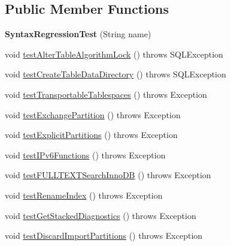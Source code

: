 \subsection*{Public Member Functions}
\begin{DoxyCompactItemize}
\item 
\mbox{\label{classtestsuite_1_1regression_1_1_syntax_regression_test_a55470891999b68b586366e1eef322aab}} 
{\bfseries Syntax\+Regression\+Test} (String name)
\item 
void \mbox{\hyperlink{classtestsuite_1_1regression_1_1_syntax_regression_test_ad8db7c4293c435d564218db929d2d30d}{test\+Alter\+Table\+Algorithm\+Lock}} ()  throws S\+Q\+L\+Exception 
\item 
void \mbox{\hyperlink{classtestsuite_1_1regression_1_1_syntax_regression_test_a5e613256d2f2d7d6fbd6144c8b050670}{test\+Create\+Table\+Data\+Directory}} ()  throws S\+Q\+L\+Exception 
\item 
void \mbox{\hyperlink{classtestsuite_1_1regression_1_1_syntax_regression_test_a947576b5790653a73ac1cf0185c76fdd}{test\+Transportable\+Tablespaces}} ()  throws Exception 
\item 
void \mbox{\hyperlink{classtestsuite_1_1regression_1_1_syntax_regression_test_a27af4a565f65e6f33db3e05e87a2035a}{test\+Exchange\+Partition}} ()  throws Exception 
\item 
void \mbox{\hyperlink{classtestsuite_1_1regression_1_1_syntax_regression_test_a4aacde39fa83ec7ba0436c5eb372a98d}{test\+Explicit\+Partitions}} ()  throws Exception 
\item 
void \mbox{\hyperlink{classtestsuite_1_1regression_1_1_syntax_regression_test_af681c26981536cc82b5c316136ec34ea}{test\+I\+Pv6\+Functions}} ()  throws Exception 
\item 
void \mbox{\hyperlink{classtestsuite_1_1regression_1_1_syntax_regression_test_ab17b59b494fc9088d01ed9da04095161}{test\+F\+U\+L\+L\+T\+E\+X\+T\+Search\+Inno\+DB}} ()  throws Exception 
\item 
void \mbox{\hyperlink{classtestsuite_1_1regression_1_1_syntax_regression_test_ab5d200050de3d77c76405bdda78d95a6}{test\+Rename\+Index}} ()  throws Exception 
\item 
void \mbox{\hyperlink{classtestsuite_1_1regression_1_1_syntax_regression_test_a1bf8ec597fe6c78a3e994f1695fbca2b}{test\+Get\+Stacked\+Diagnostics}} ()  throws Exception 
\item 
void \mbox{\hyperlink{classtestsuite_1_1regression_1_1_syntax_regression_test_afc4ff038b496b874730ce01838d0be46}{test\+Discard\+Import\+Partitions}} ()  throws Exception 

\end{DoxyCompactItemize}
